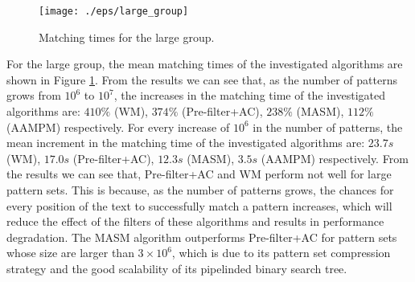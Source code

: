 \documentclass{article}
\begin{document}
\begin{figure}[htbp]
  \centering
  \texttt{[image: ./eps/large\_group]}
  \caption{Matching times for the large group.}
  \label{fig:large_group}
\end{figure}

For the large group, the mean matching times of the investigated
algorithms are shown in Figure \ref{fig:large_group}.  From the
results we can see that, as the number of patterns grows from $10^6$
to $10^7$, the increases in the matching time of the investigated
algorithms are: $410\%$ (\textsf{WM}), $374\%$
(\textsf{Pre-filter+AC}), $238\%$ (\textsf{MASM}), $112\%$
(\textsf{AAMPM}) respectively. For every increase of $10^6$ in the
number of patterns, the mean increment in the matching time of the
investigated algorithms are: $23.7s$ (\textsf{WM}), $17.0s$
(\textsf{Pre-filter+AC}), $12.3s$ (\textsf{MASM}), $3.5s$
(\textsf{AAMPM}) respectively. From the results we can see that,
\textsf{Pre-filter+AC} and \textsf{WM} perform not well for large
pattern sets. This is because, as the number of patterns grows, the
chances for every position of the text to successfully match a pattern
increases, which will reduce the effect of the filters of these
algorithms and results in performance degradation. The \textsf{MASM}
algorithm outperforms \textsf{Pre-filter+AC} for pattern sets whose
size are larger than $3 \times 10^6$, which is due to its pattern set
compression strategy and the good scalability of its pipelinded binary
search tree.
\end{document}
